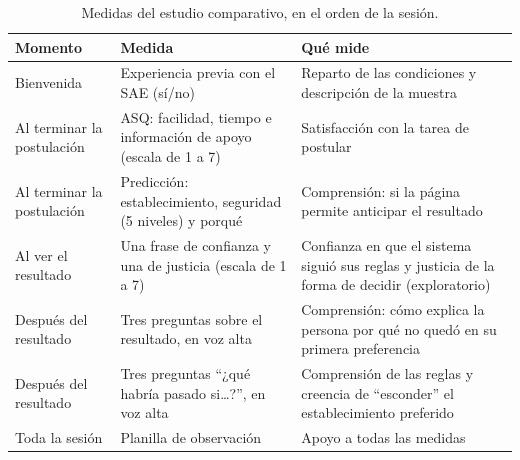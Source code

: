 \begin{table}[h]
\centering
\caption{Medidas del estudio comparativo, en el orden de la sesión.}
\label{tab:instrumento}
\small
\begin{tabular}{p{3.0cm}p{4.6cm}p{4.6cm}}
\toprule
\textbf{Momento} & \textbf{Medida} & \textbf{Qué mide} \\
\midrule
Bienvenida & Experiencia previa con el SAE (sí/no) & Reparto de las condiciones y descripción de la muestra \\
Al terminar la postulación & ASQ: facilidad, tiempo e información de apoyo (escala de 1 a 7) & Satisfacción con la tarea de postular \\
Al terminar la postulación & Predicción: establecimiento, seguridad (5 niveles) y porqué & Comprensión: si la página permite anticipar el resultado \\
Al ver el resultado & Una frase de confianza y una de justicia (escala de 1 a 7) & Confianza en que el sistema siguió sus reglas y justicia de la forma de decidir (exploratorio) \\
Después del resultado & Tres preguntas sobre el resultado, en voz alta & Comprensión: cómo explica la persona por qué no quedó en su primera preferencia \\
Después del resultado & Tres preguntas ``¿qué habría pasado si\ldots?'', en voz alta & Comprensión de las reglas y creencia de ``esconder'' el establecimiento preferido \\
Toda la sesión & Planilla de observación & Apoyo a todas las medidas \\
\bottomrule
\end{tabular}
\end{table}

